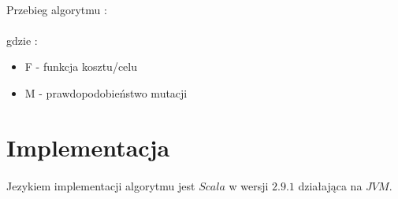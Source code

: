 \documentclass[wide,a4paper,titlepage,12pt] {article}
\begin{document}
\paragraph{}
Przebieg algorytmu :
\lstset{ %
    language=java,                %
    basicstyle=\scriptsize,       %
    numbers=left,                   %
    numberstyle=\scriptsize,      %
    stepnumber=10,                   %
    numbersep=9pt,                  %
    showspaces=false,               %
    showstringspaces=false,         %
    showtabs=false,                 %
    breaklines=true,                %
    }
    
    \paragraph{}
    gdzie :
    \begin{itemize}
        \item F - funkcja kosztu/celu
        \item M - prawdopodobieństwo mutacji

    \end{itemize}

\section{Implementacja}
\paragraph{}
Jezykiem implementacji algorytmu jest $Scala$ w wersji $2.9.1$ działająca na $JVM$.
\end{document}

